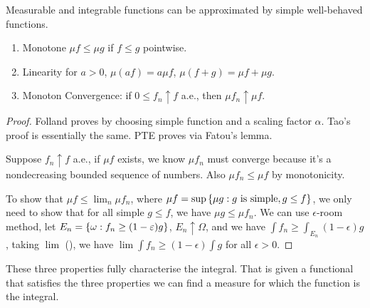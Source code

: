 \begin{thm}
    Measurable and integrable functions can be approximated by simple well-behaved functions.   
\end{thm}
\begin{thm}
    \begin{enumerate}
        \item Monotone \(\mu f \leq \mu g\) if \(f \leq g\) pointwise.
        \item Linearity for \(a > 0\), \(\mu (af) = a \mu f\), \(\mu(f + g)=  \mu f + \mu g\).
        \item Monoton Convergence: if \(0 \leq f_{n} \uparrow f\) a.e., then \(\mu f_{n} \uparrow \mu f\). 
    \end{enumerate}
\end{thm}
\begin{proof}
    Folland proves by choosing simple function and a scaling factor \(\alpha\). Tao's proof is essentially the same.
    PTE proves via Fatou's lemma. 
    
    Suppose \(f_{n}\uparrow f\) a.e., if \(\mu f\) exists, we know \(\mu f_{n}\) must converge because it's a nondecreasing bounded sequence of numbers. Also \(\mu f_{n} \leq \mu f\) by monotonicity. 

    To show that \(\mu f \leq \lim_{n} \mu f_{n}\), where \(\mu f = \sup \Bqty{\mu g: g \text{ is simple}, g \leq f}\), we only need to show that for all simple \(g \leq f\), we have \(\mu g \leq \mu f_{n}\). We can use \(\epsilon\)-room method, let \(E_{n} = \Bqty{\omega: f_{n} \geq (1 - \epsilon) g}\), \(E_{n} \uparrow \Omega\), and we have \(\int f_{n} \geq \int_{E_{n}} (1 - \epsilon)g\), taking \(\lim\) (), we have \(\lim \int f_{n} \geq (1 - \epsilon) \int g\) for all \(\epsilon> 0\). 
\end{proof}


\begin{remark}
    These three properties fully characterise the integral. That is given a functional that satisfies the three properties we can find a measure for which the function is the integral. 
\end{remark}

